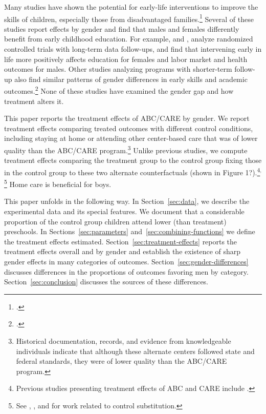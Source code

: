 Many studies have shown the potential for early-life interventions to improve the skills of children, especially those from disadvantaged families.\footnote{\citet{Currie_2011_AER,Elango_Hojman_etal_2016_Early-Edu}.} Several of these studies report effects by gender and find that males and females differently benefit from early childhood education. For example, \citet{Heckman_Moon_etal_2010_QE} and \citet{Garcia_Heckman_Leaf_etal_2017_Comp_CBA_Unpublished}, analyze randomized controlled trials with long-term data follow-ups, and find that intervening early in life more positively affects education for females and labor market and health outcomes for males. Other studies analyzing programs with shorter-term follow-up also find similar patterns of gender differences in early skills and academic outcomes.\footnote{\citet{Deming_2009_AEJAE,Ou_Reynolds_2010_Mechanisms_CYSR,Magnuson_Kelchen_Duncan_etal_2016_ECRQ}.} None of these studies have examined the gender gap and how treatment alters it.

This paper reports the treatment effects of ABC/CARE by gender. We report treatment effects comparing treated outcomes with different control conditions, including staying at home or attending other center-based care that was of lower quality than the ABC/CARE program.\footnote{Historical documentation, records, and evidence from knowledgeable individuals indicate that although these alternate centers followed state and federal standards, they were of lower quality than the ABC/CARE program.} Unlike previous studies, we compute treatment effects comparing the treatment group to the control group fixing those in the control group to these two alternate counterfactuals (shown in Figure 1?).\footnote{Previous studies presenting treatment effects of ABC and CARE include \citet{Ramey_etal_1985_Project-CARE_TiECSE, Clarke_Campbell_1998_ABC_Comparison_ECRQ,Campbell_Pungello_etal_2001_DP,Campbell_Ramey_etal_2002_ADS,Campbell_Wasik_etal_2008_ECRQ,Campbell_Conti_etal_2014_EarlyChildhoodInvestments}.}$^,$\footnote{See \cite{Heckman_1992_randomization}, \cite{Heckman_Hohmann_etal_2000_QJE}, and \cite{Kline_Walters_2016_QJE} for work related to control substitution.} Home care is beneficial for boys. 

This paper unfolds in the following way. In Section~\ref{sec:data}, we describe the experimental data and its special features. We document that a considerable proportion of the control group children attend lower (than treatment) preschools. In Sections~\ref{sec:parameters} and~\ref{sec:combining-functions} we define the treatment effects estimated. Section~\ref{sec:treatment-effects} reports the treatment effects overall and by gender and establish the existence of sharp gender effects in many categories of outcomes. Section~\ref{sec:gender-differences} discusses differences in the proportions of outcomes favoring men by category. Section~\ref{sec:conclusion} discusses the sources of these differences.


